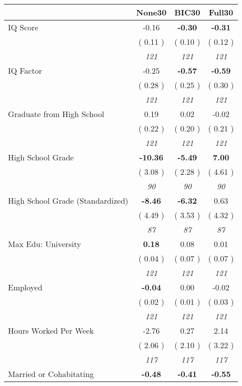 \begin{tabular}{l c c c}
\toprule
 & None30 & BIC30 & Full30 \\
\midrule
IQ Score &     -0.16 & \textbf{     -0.30 } & \textbf{     -0.31 } \\
& (     0.11 ) & (     0.10 ) & (     0.12 ) \\
& \textit{ 121 } & \textit{ 121 } & \textit{ 121 } \\
IQ Factor &     -0.25 & \textbf{     -0.57 } & \textbf{     -0.59 } \\
& (     0.28 ) & (     0.25 ) & (     0.30 ) \\
& \textit{ 121 } & \textit{ 121 } & \textit{ 121 } \\
Graduate from High School &      0.19 &      0.02 &     -0.02 \\
& (     0.22 ) & (     0.20 ) & (     0.21 ) \\
& \textit{ 121 } & \textit{ 121 } & \textit{ 121 } \\
High School Grade & \textbf{    -10.36 } & \textbf{     -5.49 } & \textbf{      7.00 } \\
& (     3.08 ) & (     2.28 ) & (     4.61 ) \\
& \textit{ 90 } & \textit{ 90 } & \textit{ 90 } \\
High School Grade (Standardized) & \textbf{     -8.46 } & \textbf{     -6.32 } &      0.63 \\
& (     4.49 ) & (     3.53 ) & (     4.32 ) \\
& \textit{ 87 } & \textit{ 87 } & \textit{ 87 } \\
Max Edu: University & \textbf{      0.18 } &      0.08 &      0.01 \\
& (     0.04 ) & (     0.07 ) & (     0.07 ) \\
& \textit{ 121 } & \textit{ 121 } & \textit{ 121 } \\
Employed & \textbf{     -0.04 } &      0.00 &     -0.02 \\
& (     0.02 ) & (     0.01 ) & (     0.03 ) \\
& \textit{ 121 } & \textit{ 121 } & \textit{ 121 } \\
Hours Worked Per Week &     -2.76 &      0.27 &      2.14 \\
& (     2.06 ) & (     2.10 ) & (     3.22 ) \\
& \textit{ 117 } & \textit{ 117 } & \textit{ 117 } \\
Married or Cohabitating & \textbf{     -0.48 } & \textbf{     -0.41 } & \textbf{     -0.55 } \\

\end{tabular}
